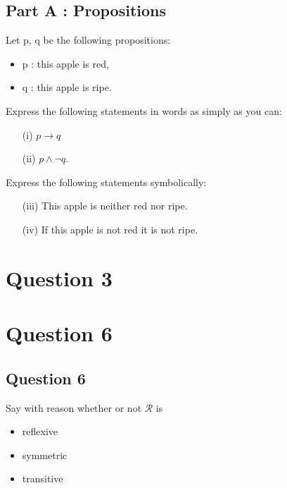 \documentclass[]{report}
\begin{document}
\subsection*{Part A : Propositions}
Let p, q be the following propositions:
\begin{itemize}
	\item p : this apple is red, 
	\item q : this apple is ripe.
\end{itemize}

\noindent Express the following statements in words as simply as you can:
\begin{itemize}
	\item[(i)] $p \rightarrow q$
	\item[(ii)] $p \wedge \neg q$.
\end{itemize}

\noindent Express the following statements symbolically:
\begin{itemize}
	\item[(iii)] This apple is neither red nor ripe.
	\item[(iv)] If this apple is not red it is not ripe.
\end{itemize}



\newpage
\section*{Question 3}





\section*{Question 6}

\subsection{Question 6}
Say with reason whether or not $\mathcal{R}$ is
\begin{itemize}
	\item reflexive
	\item symmetric
	\item transitive
\end{itemize}
\end{document}
